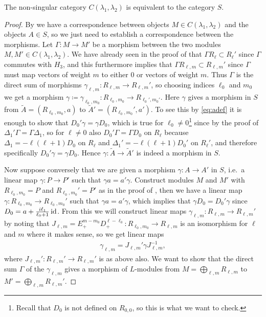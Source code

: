 \begin{theorem}\label{thm:nonsingcateq}
  The non-singular category $C(\lambda_1,\lambda_2)$ is equivalent to the category $S$.
\end{theorem}
\begin{proof}
  By  we have a correspondence between objects $M\in C(\lambda_1,\lambda_2)$ and the objects $A\in S$, so we just need to establish a correspondence between the morphisms. Let $\Gamma\colon M\to M'$ be a morphism between the two modules $M,M'\in C(\lambda_1,\lambda_2)$. We have already seen in the proof of  that $\Gamma R_\ell\subset R_\ell'$ since $\Gamma$ commutes with $H_3$, and this furthermore implies that $\Gamma R_{\ell,m}\subset R_{\ell,m}'$ since $\Gamma$ must map vectors of weight $m$ to either $0$ or vectors of weight $m$. Thus $\Gamma$ is the direct sum of morphisms $\gamma_{\ell,m}\colon R_{\ell,m}\to R_{\ell,m}'$, so choosing indices $\ell_0$ and $m_0$ we get a morphism $\gamma\coloneqq \gamma_{\ell_0,m_0}\colon R_{\ell_0,m_0}\to R_{\ell_0',m_0'}$. Here $\gamma$ gives a morphism in $S$ from $\widetilde{A}=(R_{\ell_0,m_0},a)$ to $\widetilde{A}'=(R_{\ell_0,m_0}',a')$. To see this by \cref{eq:adef} it is enough to show that $D_0'\gamma = \gamma D_0$, which is true for $\ell_0\neq0$\footnote{Recall that $D_0$ is not defined on $R_{0,0}$, so this is what we want to check.} since by the proof of  $\Delta_1'\Gamma=\Gamma\Delta_1$, so for $\ell\neq 0$ also $D_0'\Gamma=\Gamma D_0$ on $R_\ell$ because $\Delta_1=-\ell(\ell+1)D_0$ on $R_\ell$ and $\Delta_1'=-\ell(\ell+1)D_0'$ on $R_\ell'$, and therefore specifically $D_0' \gamma = \gamma D_0$. Hence $\gamma\colon \widetilde{A}\to \widetilde{A}'$ is indeed a morphism in $S$.

  Now suppose conversely that we are given a morphism $\gamma\colon A\to A'$ in $S$, i.e.\ a linear map $\gamma\colon P\to P'$ such that $\gamma a=a'\gamma$. Construct modules $M$ and $M'$ with $R_{\ell_0,m_0}=P$ and $R_{\ell_0,m_0}'=P'$ as in the proof of , then we have a linear map $\gamma\colon R_{\ell_0,m_0}\to R_{\ell_0,m_0}'$ such that $\gamma a=a'\gamma$, which implies that $\gamma D_0=D_0'\gamma$ since $D_0=a+\tfrac{i\ell_1}{\ell_0+1}\operatorname{id}$. From this we will construct linear maps $\gamma_{\ell,m}\colon R_{\ell,m}\to R_{\ell,m}'$ by noting that $J_{\ell,m}=E_+^{m-m_0}D_+^{\ell-\ell_0}\colon R_{\ell_0,m_0}\to R_{\ell,m}$ is an isomorphism for $\ell$ and $m$ where it makes sense, so we get linear maps
  \begin{align}\label{eq:tempgammalm}
    \gamma_{\ell,m} = J_{\ell,m}' \gamma J_{\ell,m}^{-1},
  \end{align}
  where $J_{\ell,m}'\colon R_{\ell,m}'\to R_{\ell,m}'$ is as above also. We want to show that the direct sum $\Gamma$ of the $\gamma_{\ell,m}$ gives a morphism of $L$-modules from $M=\bigoplus_{\ell,m} R_{\ell,m}$ to $M'=\bigoplus_{\ell,m} R_{\ell,m}'$. 


\end{proof}
